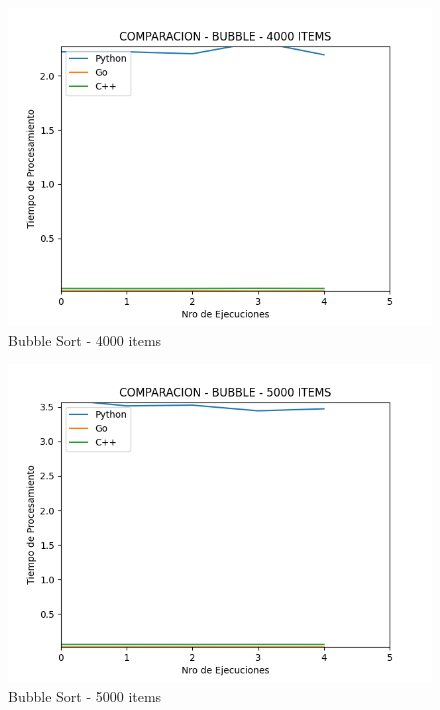 \documentclass[12pt]{article} %
\begin{document}
    \begin{figure}[H]
    \centering
    \includegraphics[width=\textwidth]{bubble_4000}
    \caption{Bubble Sort - 4000 items}
    \end{figure}

    \vspace{5mm}
    
    \begin{figure}[H]
    \centering
    \includegraphics[width=\textwidth]{bubble_5000}
    \caption{Bubble Sort - 5000 items}
    \end{figure}

    \vspace{5mm}
    
\end{document}
